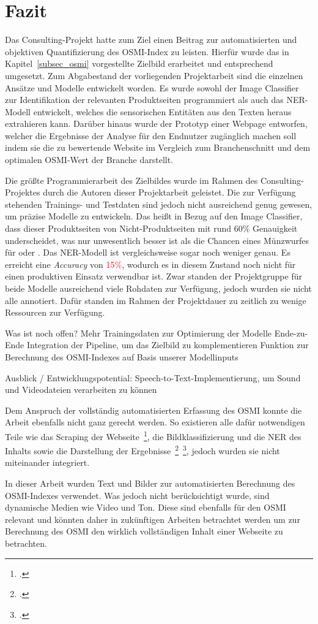 \section{Fazit}
Das Consulting-Projekt hatte zum Ziel einen Beitrag zur automatisierten und objektiven Quantifizierung des
\ac{OSMI}-Index zu leisten.
Hierfür wurde das in Kapitel~\ref{subsec_osmi} vorgestellte Zielbild erarbeitet und entsprechend umgesetzt.
Zum Abgabestand der vorliegenden Projektarbeit sind die einzelnen Ansätze und Modelle entwickelt worden.
Es wurde sowohl der Image Classifier zur Identifikation der relevanten Produktseiten programmiert als auch das \ac{NER}-Modell
entwickelt, welches die sensorischen Entitäten aus den Texten heraus extrahieren kann.
Darüber hinaus wurde der Prototyp einer Webpage entworfen, welcher die Ergebnisse der Analyse
für den Endnutzer zugänglich machen soll indem sie die zu bewertende Website im Vergleich zum Branchenschnitt und dem optimalen \ac{OSMI}-Wert
der Branche darstellt.

Die größte Programmierarbeit des Zielbildes wurde im Rahmen des Consulting-Projektes durch die Autoren dieser Projektarbeit
geleistet.
Die zur Verfügung stehenden Trainings- und Testdaten sind jedoch nicht ausreichend genug gewesen, um präzise Modelle
zu entwickeln.
Das heißt in Bezug auf den Image Classifier, dass dieser Produktseiten von Nicht-Produktseiten mit rund 60\% Genauigkeit underscheidet,
was nur unwesentlich besser ist als die Chancen eines Münzwurfes für \grqq{} oder \grqq{}.
Das \ac{NER}-Modell ist vergleichsweise sogar noch weniger genau. Es erreicht eine \textit{Accuracy} von \textcolor{red}{15\%},
wodurch es in diesem Zustand noch nicht für einen produktiven Einsatz verwendbar ist. 
Zwar standen der Projektgruppe für beide Modelle ausreichend viele Rohdaten zur Verfügung, jedoch wurden sie nicht alle annotiert. Dafür standen im Rahmen der Projektdauer zu zeitlich zu
wenige Ressourcen zur Verfügung.


Was ist noch offen?
Mehr Trainingsdaten zur Optimierung der Modelle
Ende-zu-Ende Integration der Pipeline, um das Zielbild zu komplementieren
Funktion zur Berechnung des OSMI-Indexes auf Basis unserer Modellinputs

Ausblick  / Entwicklungspotential:
Speech-to-Text-Implementierung, um Sound und Videodateien verarbeiten zu können

Dem Anspruch der vollständig automatisierten Erfassung des \ac{OSMI} konnte die Arbeit ebenfalls nicht ganz gerecht werden. So existieren alle dafür notwendigen Teile wie das Scraping der Webseite~\footcite[\vglf][]{ostkamp2022a}, die Bildklassifizierung und die \acl{NER} des Inhalts sowie die Darstellung der Ergebnisse~\footcite[\vglf][]{ostkamp2022b}~\footcite[\vglf][]{ostkamp2022c},
jedoch wurden sie nicht miteinander integriert.

In dieser Arbeit wurden Text und Bilder zur automatisierten Berechnung des \ac{OSMI}-Indexes verwendet. Was jedoch nicht berücksichtigt wurde, sind dynamische Medien wie Video und Ton.
Diese sind ebenfalls für den OSMI relevant und könnten daher in zukünftigen Arbeiten betrachtet werden um zur Berechnung des OSMI den wirklich vollständigen Inhalt einer Webseite zu betrachten.